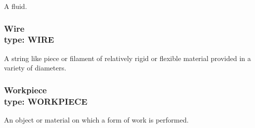 A fluid.



\subsubsection[Wire]{Wire \\ {\small type: WIRE}}
\label{sec:Wire}



A string like piece or filament of relatively rigid or flexible material provided in a variety of diameters.



\subsubsection[Workpiece]{Workpiece \\ {\small type: WORKPIECE}}
\label{sec:Workpiece}



An object or material on which a form of work is performed.


